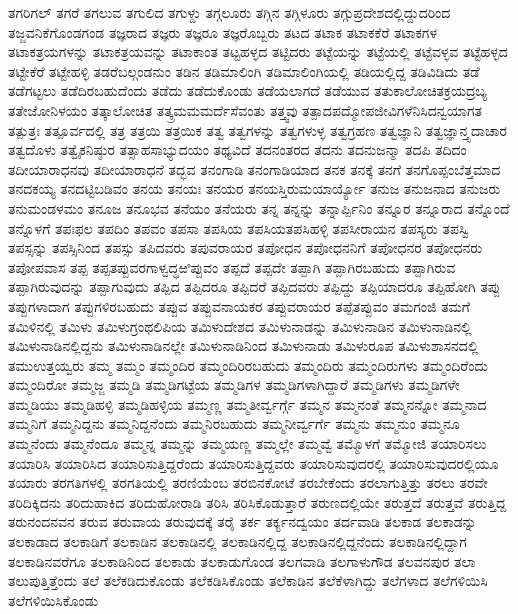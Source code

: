 {ತಗರಿಗಲ್
ತಗರೆ
ತಗಲುವ
ತಗುಲಿದ
ತಗುಳ್ದು
ತಗ್ಗಲೂರು
ತಗ್ಗಿನ
ತಗ್ಗಿಳೂರು
ತಗ್ಗುಪ್ರದೇಶದಲ್ಲಿದ್ದುದರಿಂದ
ತಜ್ಜವನಿಕೆಗೊಂಡಗಂಡ
ತಜ್ಞರಾದ
ತಜ್ಞರು
ತಜ್ಞರೂ
ತಜ್ಞರೊಬ್ಬರು
ತಟದ
ತಟಾಕ
ತಟಾಕಕೆರೆ
ತಟಾಕಗಳ
ತಟಾಕತ್ರಯಗಳನ್ನು
ತಟಾಕತ್ರಯವನ್ನು
ತಟಾಕಾಂತ
ತಟ್ಟಹಳ್ಳದ
ತಟ್ಟಿದರು
ತಟ್ಟೆಯನ್ನು
ತಟ್ಟೆಯಲ್ಲಿ
ತಟ್ಟೆವಳ್ಳವ
ತಟ್ಟೆಹಳ್ಳದ
ತಟ್ಟೇಕೆರೆ
ತಟ್ಟೇಹಳ್ಳಿ
ತಡರೆಬಲ್ಗಂಡನುಂ
ತಡಿನ
ತಡಿಮಾಲಿಂಗಿ
ತಡಿಮಾಲಿಂಗಿಯಲ್ಲಿ
ತಡಿಯಲ್ಲಿದ್ದ
ತಡಿವಿಡಿದು
ತಡೆ
ತಡೆಗಟ್ಟಲು
ತಡೆದಿರಬಹುದೆಂದು
ತಡೆದು
ತಡೆದುಕೊಂಡು
ತಡೆಯಲಾಗದೆ
ತಡೆಯುವ
ತತುಕಾಲೋಚಿತಕ್ರಯದ್ರಬ್ಯ
ತತೇಜೋನಿಳಯಂ
ತತ್ಕಾಲೋಚಿತ
ತತ್ಕ್ರಮಮಮರ್ದೆಸೆವಂತು
ತತ್ತ್ವವು
ತತ್ಪಾದಪದ್ಮೋಪಜೀವಿಗಳೆನಿಸಿದನ್ವಯಾಗತ
ತತ್ಪುತ್ರಃ
ತತ್ಪೂರ್ವದಲ್ಲಿ
ತತ್ರ
ತತ್ರಯಿ
ತತ್ರಯಿಕ
ತತ್ವ
ತತ್ವಗಳನ್ನು
ತತ್ವಗಳುಳ್ಳ
ತತ್ವಗ್ರಹಣ
ತತ್ವಜ್ಞಾನಿ
ತತ್ವಜ್ಞಾನ್ತ್ಸದಾಚಾರ
ತತ್ವದೊಳು
ತತ್ವೈಕನಿಷ್ಠುರ
ತತ್ಸಾಹಸಾಭ್ಯುದಯಂ
ತಥ್ಯವಿದೆ
ತದನಂತರದ
ತದನು
ತದನುಜನ್ಮಾ
ತದಪಿ
ತದಿದಂ
ತದೀಯಾರಾಧನವು
ತದೀಯಾರಾಧನೆ
ತದ್ಭವ
ತನಂಗಾಡಿ
ತನಂಗಾಡಿಯಾದ
ತನಕ
ತನಕ್ಕೆ
ತನಗೆ
ತನಗೊಪ್ಪಂಬೆತ್ತಮಾದ
ತನದಕಯ್ಯ
ತನದಟ್ಟಿಬಡಿವಂ
ತನಯ
ತನಯಃ
ತನಯರ
ತನಯಸ್ತಿರುಮಯಾರ್ಯ್ಯೋ
ತನುಜ
ತನುಜನಾದ
ತನುಜರು
ತನುಮಂಡಳಮಂ
ತನೂಜ
ತನೂಭವ
ತನೆಯಂ
ತನೆಯರು
ತನ್ನ
ತನ್ನನ್ನು
ತನ್ನಾರ್ಪ್ಪಿನಿಂ
ತನ್ನೂರ
ತನ್ನೂರಾದ
ತನ್ನೊಂದೆ
ತನ್ನೊಳಗೆ
ತಪಃಫಲ
ತಪದಿಂ
ತಪವಂ
ತಪಸಾ
ತಪಸಿಯ
ತಪಸಿಯತಪಸಿಹಳ್ಳಿ
ತಪಸೀರಾಯನ
ತಪಸ್ಯರು
ತಪಸ್ವಿ
ತಪಸ್ಸನ್ನು
ತಪಸ್ಸಿನಿಂದ
ತಪಸ್ಸು
ತಪಿದವರು
ತಪುವರಾಯರ
ತಪೋಧನ
ತಪೋಧನನಿಗೆ
ತಪೋಧನರ
ತಪೋಧನರು
ತಪೋಪವಾಸ
ತಪ್ಪ
ತಪ್ಪತಪ್ಪುವರಗಾಳ್ವದ್ಧಱಿಪ್ಪುವಂ
ತಪ್ಪದೆ
ತಪ್ಪದೇ
ತಪ್ಪಾಗಿ
ತಪ್ಪಾಗಿರಬಹುದು
ತಪ್ಪಾಗಿರುವ
ತಪ್ಪಾಗಿರುವುದನ್ನು
ತಪ್ಪಾಗುವುದು
ತಪ್ಪಿದ
ತಪ್ಪಿದರೂ
ತಪ್ಪಿದರೆ
ತಪ್ಪಿದವರು
ತಪ್ಪಿದ್ದು
ತಪ್ಪಿಯಾದರೂ
ತಪ್ಪಿಹೋಗಿ
ತಪ್ಪು
ತಪ್ಪುಗಳಾದಾಗ
ತಪ್ಪುಗಳಿರಬಹುದು
ತಪ್ಪುವ
ತಪ್ಪುವನಾಯಕರ
ತಪ್ಪುವರಾಯರ
ತಪ್ಪೆತಪ್ಪುವಂ
ತಮಗಂಜಿ
ತಮಗೆ
ತಮಿಳಿನಲ್ಲಿ
ತಮಿಳು
ತಮಿಳುಗ್ರಂಥಲಿಪಿಯ
ತಮಿಳುದೇಶದ
ತಮಿಳುನಾಡನ್ನು
ತಮಿಳುನಾಡಿನ
ತಮಿಳುನಾಡಿನಲ್ಲಿ
ತಮಿಳುನಾಡಿನಲ್ಲಿದ್ದನು
ತಮಿಳುನಾಡಿನಲ್ಲೇ
ತಮಿಳುನಾಡಿನಿಂದ
ತಮಿಳುನಾಡು
ತಮಿಳುರೂಪ
ತಮಿಳುಶಾಸನದಲ್ಲಿ
ತಮುಉತ್ತಯ್ವರು
ತಮ್ಮ
ತಮ್ಮಂ
ತಮ್ಮಂದಿರ
ತಮ್ಮಂದಿರಿರಬಹುದು
ತಮ್ಮಂದಿರು
ತಮ್ಮಂದಿರುಗಳು
ತಮ್ಮಂದಿರೆಂದು
ತಮ್ಮಂದಿರೋ
ತಮ್ಮಜ್ಜ
ತಮ್ಮಡಿ
ತಮ್ಮಡಿಗಟ್ಟೆಯ
ತಮ್ಮಡಿಗಳ
ತಮ್ಮಡಿಗಳಾಗಿದ್ದಾರೆ
ತಮ್ಮಡಿಗಳು
ತಮ್ಮಡಿಗಳೇ
ತಮ್ಮಡಿಯು
ತಮ್ಮಡಿಹಳ್ಳಿ
ತಮ್ಮಡಿಹಳ್ಳಿಯ
ತಮ್ಮಣ್ಣ
ತಮ್ಮತೀರ್ವ್ವರ್ಗ್ಗೆ
ತಮ್ಮನ
ತಮ್ಮನಂತೆ
ತಮ್ಮನನ್ನೋ
ತಮ್ಮನಾದ
ತಮ್ಮನಿಗೆ
ತಮ್ಮನಿದ್ದನು
ತಮ್ಮನಿದ್ದನೆಂದು
ತಮ್ಮನಿರಬಹುದು
ತಮ್ಮನೀರ್ವ್ವರ್ಗೆ
ತಮ್ಮನು
ತಮ್ಮನುಂ
ತಮ್ಮನೂ
ತಮ್ಮನೆಂದು
ತಮ್ಮನೆಂದೂ
ತಮ್ಮನ್ನ
ತಮ್ಮನ್ನು
ತಮ್ಮಯಣ್ಣ
ತಮ್ಮಲ್ಲೇ
ತಮ್ಮವ್ವೆ
ತಮ್ಮೊಳಗೆ
ತಮ್ಮೋಜಿ
ತಯಾರಿಸಲು
ತಯಾರಿಸಿ
ತಯಾರಿಸಿದ
ತಯಾರಿಸುತ್ತಿದ್ದರೆಂದು
ತಯಾರಿಸುತ್ತಿದ್ದವರು
ತಯಾರಿಸುವುದರಲ್ಲಿ
ತಯಾರಿಸುವುದರಲ್ಲಿಯೂ
ತಯಾರು
ತರಗತಿಗಳಲ್ಲಿ
ತರಗತಿಯಲ್ಲಿ
ತರಣಿಯೆಂಬ
ತರಬಿನಕೋಟೆ
ತರಬೇಕೆಂದು
ತರಲಾಗುತ್ತಿತ್ತು
ತರಲು
ತರವೇ
ತರಿದಿಕ್ಕಿದನು
ತರಿದುಹಾಕಿದ
ತರಿದುಹೋರಾಡಿ
ತರಿಸಿ
ತರಿಸಿಕೊಡುತ್ತಾರೆ
ತರುಣದಲ್ಲಿಯೇ
ತರುತ್ತದೆ
ತರುತ್ತವೆ
ತರುತ್ತಿದ್ದ
ತರುನಂದನವನ
ತರುವ
ತರುವಾಯ
ತರುವುದಕ್ಕೆ
ತರೈ
ತರ್ಕ
ತರ್ಕ್ಯನದ್ವಯಂ
ತರ್ದವಾಡಿ
ತಲಕಾಡ
ತಲಕಾಡನ್ನು
ತಲಕಾಡಾದ
ತಲಕಾಡಿಗೆ
ತಲಕಾಡಿನ
ತಲಕಾಡಿನಲ್ಲಿ
ತಲಕಾಡಿನಲ್ಲಿದ್ದ
ತಲಕಾಡಿನಲ್ಲಿದ್ದನೆಂದು
ತಲಕಾಡಿನಲ್ಲಿದ್ದಾಗ
ತಲಕಾಡಿನವರೆಗೂ
ತಲಕಾಡಿನಿಂದ
ತಲಕಾಡು
ತಲಕಾಡುಗೊಂಡ
ತಲಗವಾಡಿ
ತಲಗಾಳುಗೌಡ
ತಲವನಪುರ
ತಲಾ
ತಲುಪುತ್ತಿತ್ತೆಂದು
ತಲೆ
ತಲೆಕಡಿದುಕೊಂಡು
ತಲೆಕಡಿಸಿಕೊಂಡು
ತಲೆಕಾಡಿನ
ತಲೆಕೆಳಾಗಿದ್ದು
ತಲೆಗಳಾದ
ತಲೆಗಳಿಯಿಸಿ
ತಲೆಗಳಿಯಿಸಿಕೊಂಡು
}
